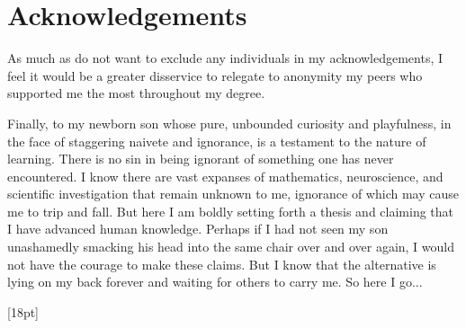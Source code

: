 \documentclass[11pt]{report}
\begin{document}
\newpage
\chapter*{Acknowledgements}
As much as do not want to exclude any individuals in my acknowledgements, I feel it would be a greater disservice to relegate to anonymity my peers who supported me the most throughout my degree.

Finally, to my newborn son whose pure, unbounded curiosity and playfulness, in the face of staggering naivete and ignorance, is a testament to the nature of learning. There is no sin in being ignorant of something one has never encountered. I know there are vast expanses of mathematics, neuroscience, and scientific investigation that remain unknown to me, ignorance of which may cause me to trip and fall. But here I am boldly setting forth a thesis and claiming that I have advanced human knowledge. Perhaps if I had not seen my son unashamedly smacking his head into the same chair over and over again, I would not have the courage to make these claims. But I know that the alternative is lying on my back forever and waiting for others to carry me. So here I go...


\newpage


\newpage
% 


\newpage

\renewcommand*\contentsname{\color{seccolor}Table of contents}
[18pt]{\addvspace{3pt}}{\thecontentslabel\enspace}{}{\contentspage}
\tableofcontents

\newpage

\renewcommand{\chaptermark}[1]{\markboth{#1}{#1}}
\fancyhead[R]{}
\fancyhead[L]{{\color{gray}\textit{\chaptername\ \thechapter}\ --\ \leftmark}}

\setcounter{page}{1}

\renewcommand{\thefootnote}{\fnsymbol{footnote}}
\hypersetup{linkcolor=seccolor}



% 

% 

% 
\end{document}
